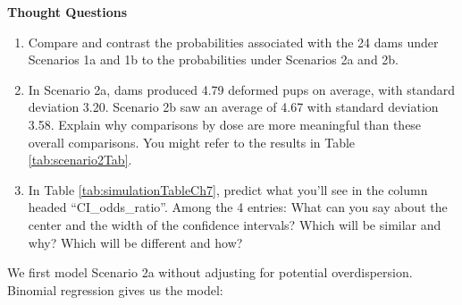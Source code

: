 \documentclass[
]{krantz}
\begin{document}
\begin{table}

\caption{\label{tab:scenario2Tab}Summary Statistics of Scenario 2 by Dose}
\centering
{}
\end{table}

\textbf{Thought Questions}

\begin{enumerate}
\def\labelenumi{\arabic{enumi}.}
\setcounter{enumi}{5}
\item
  Compare and contrast the probabilities associated with the 24 dams under Scenarios 1a and 1b to the probabilities under Scenarios 2a and 2b.
\item
  In Scenario 2a, dams produced 4.79 deformed pups on average, with standard deviation 3.20. Scenario 2b saw an average of 4.67 with standard deviation 3.58. Explain why comparisons by dose are more meaningful than these overall comparisons. You might refer to the results in Table \ref{tab:scenario2Tab}.
\item
  In Table \ref{tab:simulationTableCh7}, predict what you'll see in the column headed ``CI\_odds\_ratio''. Among the 4 entries: What can you say about the center and the width of the confidence intervals? Which will be similar and why? Which will be different and how?
\end{enumerate}

We first model Scenario 2a without adjusting for potential overdispersion. Binomial regression gives us the model:
\end{document}
